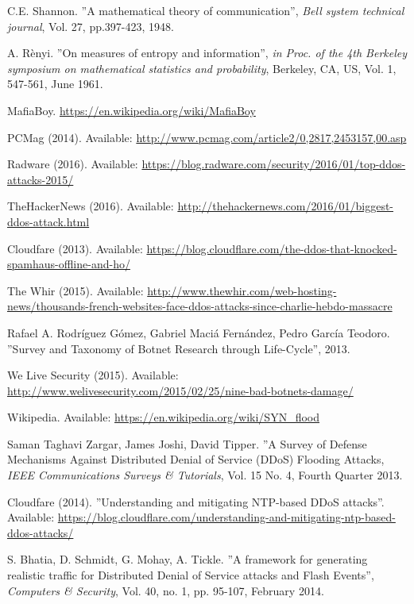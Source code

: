 \begin{thebibliography}{11}
C.E. Shannon. ''A mathematical theory of communication'', \textit{Bell system technical journal}, Vol. 27, pp.397-423, 1948.

A. Rènyi. ''On measures of entropy and information'', \textit{in Proc. of the 4th Berkeley symposium on mathematical statistics and probability}, Berkeley, CA, US, Vol. 1, 547-561, June 1961.

MafiaBoy. \url{https://en.wikipedia.org/wiki/MafiaBoy}

PCMag (2014). Available: \url{http://www.pcmag.com/article2/0,2817,2453157,00.asp}

Radware (2016). Available: \url{https://blog.radware.com/security/2016/01/top-ddos-attacks-2015/}

TheHackerNews (2016). Available: \url{http://thehackernews.com/2016/01/biggest-ddos-attack.html}

Cloudfare (2013). Available: \url{https://blog.cloudflare.com/the-ddos-that-knocked-spamhaus-offline-and-ho/}

The Whir (2015). Available: \url{http://www.thewhir.com/web-hosting-news/thousands-french-websites-face-ddos-attacks-since-charlie-hebdo-massacre}

Rafael A. Rodríguez Gómez, Gabriel Maciá Fernández, Pedro García Teodoro. ''Survey and Taxonomy of Botnet Research through Life-Cycle'', 2013.

We Live Security (2015). Available: \url{http://www.welivesecurity.com/2015/02/25/nine-bad-botnets-damage/}

Wikipedia. Available: \url{https://en.wikipedia.org/wiki/SYN\_flood}

Saman Taghavi Zargar, James Joshi, David Tipper. ''A Survey of Defense Mechanisms Against Distributed Denial of Service (DDoS) Flooding Attacks, \textit{IEEE Communications Surveys \& Tutorials}, Vol. 15 No. 4, Fourth Quarter 2013.

Cloudfare (2014). ''Understanding and mitigating NTP-based DDoS attacks''. Available: \url{https://blog.cloudflare.com/understanding-and-mitigating-ntp-based-ddos-attacks/}

S. Bhatia, D. Schmidt, G. Mohay, A. Tickle. ''A framework for generating realistic traffic for Distributed Denial of Service attacks and Flash Events'', \textit{Computers \& Security}, Vol. 40, no. 1, pp. 95-107, February 2014.

\end{thebibliography}
